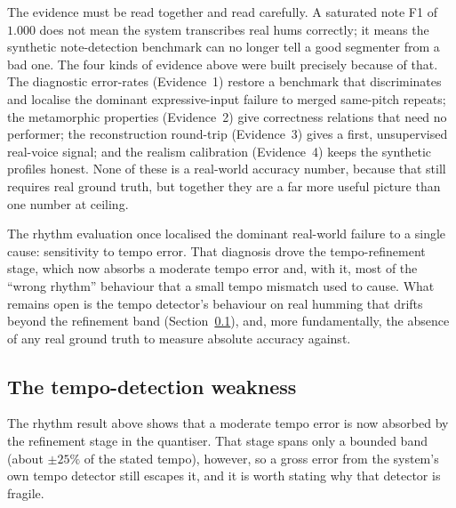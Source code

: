 \documentclass[12pt,a4paper]{article}
\begin{document}
The evidence must be read together and read carefully. A saturated note F1 of
$1.000$ does not mean the system transcribes real hums correctly; it means the
synthetic note-detection benchmark can no longer tell a good segmenter from a bad
one. The four kinds of evidence above were built precisely because of that. The
diagnostic error-rates (Evidence~1) restore a benchmark that discriminates and
localise the dominant expressive-input failure to merged same-pitch repeats; the
metamorphic properties (Evidence~2) give correctness relations that need no
performer; the reconstruction round-trip (Evidence~3) gives a first, unsupervised
real-voice signal; and the realism calibration (Evidence~4) keeps the synthetic
profiles honest. None of these is a real-world accuracy number, because that still
requires real ground truth, but together they are a far more useful picture than
one number at ceiling.

The rhythm evaluation once localised the dominant real-world failure to a single
cause: sensitivity to tempo error. That diagnosis drove the tempo-refinement
stage, which now absorbs a moderate tempo error and, with it, most of the ``wrong
rhythm'' behaviour that a small tempo mismatch used to cause. What remains open is
the tempo detector's behaviour on real humming that drifts beyond the refinement
band (Section~\ref{sec:bpm}), and, more fundamentally, the absence of any real
ground truth to measure absolute accuracy against.

\subsection{The tempo-detection weakness}
\label{sec:bpm}

The rhythm result above shows that a moderate tempo error is now absorbed by the
refinement stage in the quantiser. That stage spans only a bounded band (about
$\pm 25\%$ of the stated tempo), however, so a gross error from the system's own
tempo detector still escapes it, and it is worth stating why that detector is
fragile.
\end{document}
